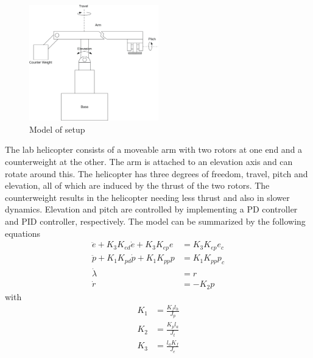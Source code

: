 \documentclass[11pt,a4paper,USenglish]{article} %
\begin{document}
\begin{figure}[!h]
\centerline{\includegraphics[width=0.5\textwidth]{model}}
\caption{Model of setup}
\label{fig:model}
\end{figure}
\noindent 
The  lab helicopter consists of a moveable arm with two rotors at one end and a counterweight at the other. The arm is attached to an elevation axis and can rotate around this. The helicopter has three degrees of freedom, travel, pitch and elevation, all of which are induced by the thrust of the two rotors. The counterweight results in the helicopter needing less thrust and also in slower dynamics. Elevation and pitch are controlled by implementing a PD controller and PID controller, respectively.
\newline
The model can be summarized by the following equations
\begin{subequations}
\label{eq:model_al}
\begin{align}
	\ddot{e} + K_{3} K_{ed} \dot{e} + K_{3} K_{ep} e &= K_{3} K_{ep} e_{c} \label{eq:model_se_al_elev} \\
	\ddot{p} + K_{1} K_{pd} \dot{p} + K_{1} K_{pp} p &= K_{1} K_{pp} p_{c} \label{eq:model_se_al_pitch} \\
	\dot{\lambda} &= r \label{eq:model_se_al_lambda} \\
	\dot{r} &= -K_{2} p \label{eq:model_se_al_r} 
\end{align}
\end{subequations}
with
\begin{subequations}
\label{eq:K}
\begin{align}
	K_{1} &= \frac{K_{f}l_{h}}{J_{p}} \label{eq:K1} \\
    K_{2} &= \frac{K_{p}l_{a}}{J_{t}} \label{eq:K2} \\
    K_{3} &= \frac{l_{a}K_{f}}{J_{e}} \label{eq:K3}
\end{align}
\end{subequations}
\newline
\end{document}

